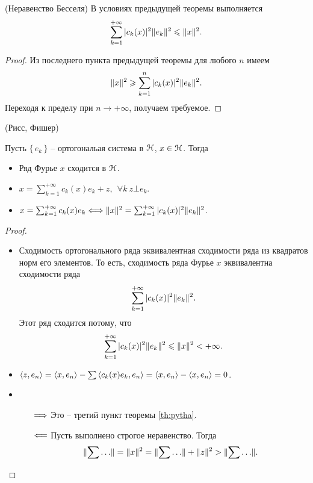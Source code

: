 \begin{corollary}(Неравенство Бесселя)
    В условиях предыдущей теоремы выполняется
    \[
        \sum_{k = 1}^{+\infty}{|c_k(x)|^2 \lVert e_k\rVert^2} \leqslant \lVert x\rVert^2
    .\]
\end{corollary}
\begin{proof}
    Из последнего пункта предыдущей теоремы для любого $n$ имеем
    \[
        \lVert x\rVert^2 \geqslant \sum_{k = 1}^n{|c_k(x)|^2 \lVert e_k\rVert^2}
    .\]
    Переходя к пределу при $n \to +\infty$, получаем требуемое.
\end{proof}

\begin{theorem}(Рисс, Фишер)
    
    Пусть $\{\,e_k\,\}$ -- ортогональая система в $\mathcal{H}$, $x \in \mathcal{H}$. Тогда
    \begin{itemize}
        \item Ряд Фурье $x$ сходится в $\mathcal{H}$.
        \item $x = \sum_{k = 1}^{+\infty}{c_k(x) e_k} + z,~~ \forall k~ z \bot e_k$.
        \item $x = \sum_{k = 1}^{+\infty}{c_k(x) e_k} \Longleftrightarrow \lVert x\rVert^2 =
            \sum_{k = 1}^{+\infty}{|c_k(x)|^2 \lVert e_k\rVert^2}$.
    \end{itemize}
\end{theorem}
\begin{proof}
    \enewline
    \begin{itemize}
        \item Сходимость ортогонального ряда эквивалентная сходимости ряда
            из квадратов норм его элементов. То есть, сходимость ряда Фурье $x$
            эквивалентна сходимости ряда
            \[
                \sum_{k = 1}^{+\infty}{|c_k(x)|^2 \lVert e_k\rVert^2}
            .\]
            Этот ряд сходится потому, что
            \[
                \sum_{k = 1}^{+\infty}{|c_k(x)|^2 \lVert e_k\rVert^2} \leqslant \lVert x\rVert^2
                < +\infty
            .\]
        \item $\langle z, e_n \rangle = \langle x, e_n \rangle - \sum{\langle c_k(x) e_k, e_n \rangle} =
            \langle x, e_n \rangle - \langle x, e_n \rangle = 0$.
        \item \begin{itemize}
            \item[$\Longrightarrow$] Это -- третий пункт теоремы \ref{th:pytha}.
            \item[$\Longleftarrow$] Пусть выполнено строгое неравенство. Тогда
                \[
                    \lVert\sum{\ldots}\rVert = \lVert x\rVert^2 = \lVert\sum{\ldots}\rVert 
                    + \lVert z\rVert^2 > \lVert\sum{\ldots}\rVert
                .\]
        \end{itemize}
    \end{itemize}
\end{proof}

